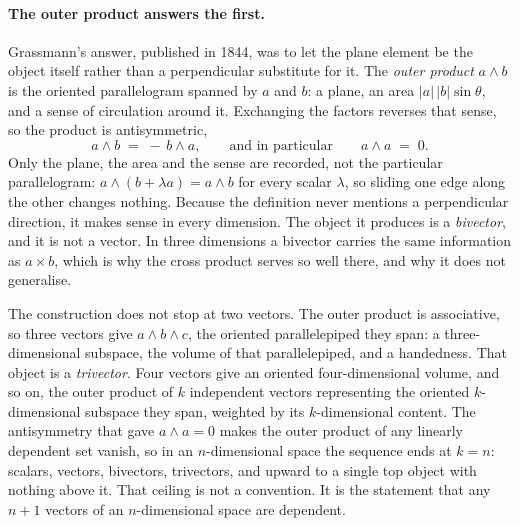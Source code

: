 \documentclass[11pt]{article}
\theoremstyle{plain}
\theoremstyle{definition}
\begin{document}
\paragraph{The outer product answers the first.} Grassmann's answer, published in 1844, was to let the plane element be the object itself rather than a perpendicular substitute for it. The \emph{outer product} $a \wedge b$ is the oriented parallelogram spanned by $a$ and $b$: a plane, an area $|a|\,|b| \sin\theta$, and a sense of circulation around it. Exchanging the factors reverses that sense, so the product is antisymmetric,
\[
a \wedge b \;=\; -\, b \wedge a , \qquad \text{and in particular} \qquad a \wedge a \;=\; 0 .
\]
Only the plane, the area and the sense are recorded, not the particular parallelogram: $a \wedge (b + \lambda a) = a \wedge b$ for every scalar $\lambda$, so sliding one edge along the other changes nothing. Because the definition never mentions a perpendicular direction, it makes sense in every dimension. The object it produces is a \emph{bivector}, and it is not a vector. In three dimensions a bivector carries the same information as $a \times b$, which is why the cross product serves so well there, and why it does not generalise.

The construction does not stop at two vectors. The outer product is associative, so three vectors give $a \wedge b \wedge c$, the oriented parallelepiped they span: a three-dimensional subspace, the volume of that parallelepiped, and a handedness. That object is a \emph{trivector}. Four vectors give an oriented four-dimensional volume, and so on, the outer product of $k$ independent vectors representing the oriented $k$-dimensional subspace they span, weighted by its $k$-dimensional content. The antisymmetry that gave $a \wedge a = 0$ makes the outer product of any linearly dependent set vanish, so in an $n$-dimensional space the sequence ends at $k = n$: scalars, vectors, bivectors, trivectors, and upward to a single top object with nothing above it. That ceiling is not a convention. It is the statement that any $n+1$ vectors of an $n$-dimensional space are dependent.
\end{document}
